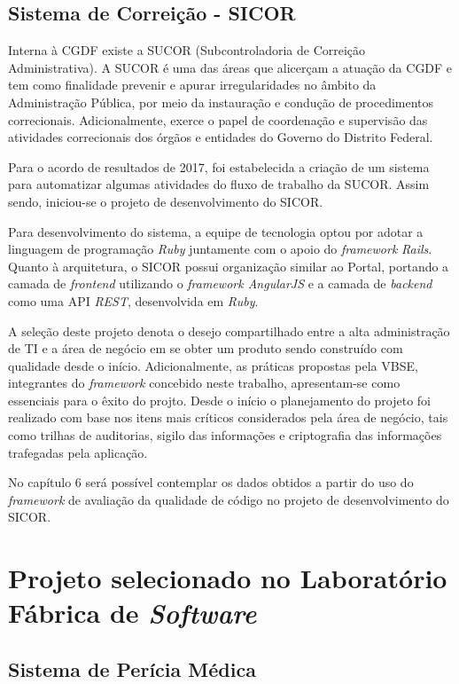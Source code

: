 \subsection{Sistema de Correição - SICOR}

Interna à CGDF existe a SUCOR (Subcontroladoria de Correição Administrativa). A SUCOR é uma das áreas que alicerçam a atuação da CGDF e tem como finalidade prevenir e apurar irregularidades no âmbito da Administração Pública, por meio da instauração e condução de procedimentos correcionais. Adicionalmente, exerce o papel de coordenação e supervisão das atividades correcionais dos órgãos e entidades do Governo do Distrito Federal.

Para o acordo de resultados de 2017, foi estabelecida a criação de um sistema para automatizar algumas atividades do fluxo de trabalho da SUCOR. Assim sendo, iniciou-se o projeto de desenvolvimento do SICOR.

Para desenvolvimento do sistema, a equipe de tecnologia optou por adotar a linguagem de programação \textit{Ruby} juntamente com o apoio do \textit{framework} \textit{Rails}. Quanto à arquitetura, o SICOR possui organização similar ao Portal, portando a camada de \textit{frontend} utilizando o \textit{framework AngularJS} e a camada de \textit{backend} como uma API \textit{REST}, desenvolvida em \textit{Ruby}.

A seleção deste projeto denota o desejo compartilhado entre a alta administração de TI e a área de negócio em se obter um produto sendo construído com qualidade desde o início. Adicionalmente, as práticas propostas pela VBSE, integrantes do \textit{framework} concebido neste trabalho, apresentam-se como essenciais para o êxito do projto. Desde o início o planejamento do projeto foi realizado com base nos itens mais críticos considerados pela área de negócio, tais como trilhas de auditorias, sigilo das informações e criptografia das informações trafegadas pela aplicação.

No capítulo 6 será possível contemplar os dados obtidos a partir do uso do \textit{framework} de avaliação da qualidade de código no projeto de desenvolvimento do SICOR.

\clearpage

\section{Projeto selecionado no Laboratório Fábrica de \textit{Software}}

\subsection{Sistema de Perícia Médica}


